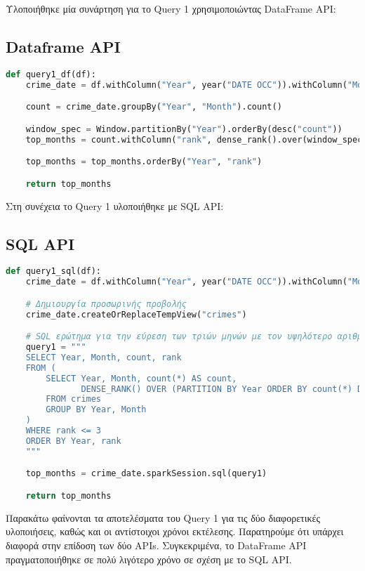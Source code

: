 \documentclass{article}
\begin{document}
Υλοποιήθηκε μία συνάρτηση για το Query 1 χρησιμοποιώντας DataFrame API: 
\subsection*{Dataframe API}

\begin{lstlisting}[language = Python]
    def query1_df(df):
    crime_date = df.withColumn("Year", year("DATE OCC")).withColumn("Month", month("DATE OCC"))

    count = crime_date.groupBy("Year", "Month").count()

    window_spec = Window.partitionBy("Year").orderBy(desc("count"))
    top_months = count.withColumn("rank", dense_rank().over(window_spec)).filter(col("rank") <= 3)

    top_months = top_months.orderBy("Year", "rank")

    return top_months
\end{lstlisting}  

Στη συνέχεια το Query 1 υλοποιήθηκε με SQL API:
\subsection*{SQL API}

\begin{lstlisting}[language = Python]
    def query1_sql(df):
    crime_date = df.withColumn("Year", year("DATE OCC")).withColumn("Month", month("DATE OCC"))

    # Δημιουργία προσωρινής προβολής
    crime_date.createOrReplaceTempView("crimes")

    # SQL ερώτημα για την εύρεση των τριών μηνών με τον υψηλότερο αριθμό εγκλημάτων ανά έτος
    query1 = """
    SELECT Year, Month, count, rank 
    FROM (
        SELECT Year, Month, count(*) AS count, 
               DENSE_RANK() OVER (PARTITION BY Year ORDER BY count(*) DESC) AS rank
        FROM crimes
        GROUP BY Year, Month
    ) 
    WHERE rank <= 3
    ORDER BY Year, rank
    """

    top_months = crime_date.sparkSession.sql(query1)

    return top_months

\end{lstlisting}  

Παρακάτω φαίνονται τα αποτελέσματα του Query 1 για τις δύο διαφορετικές υλοποιήσεις, καθώς και οι αντίστοιχοι χρόνοι εκτέλεσης. Παρατηρούμε ότι υπάρχει διαφορά στην επίδοση των δύο APIs. Συγκεκριμένα, το DataFrame API πραγματοποιήθηκε σε πολύ λιγότερο χρόνο σε σχέση με το SQL API.
\end{document}
